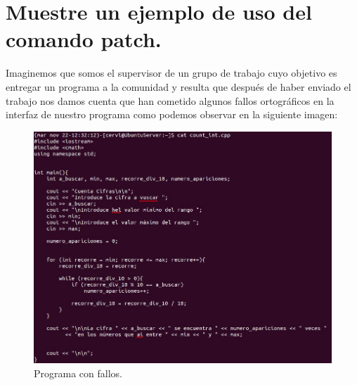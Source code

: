 \section{Muestre un ejemplo de uso del comando patch.}
Imaginemos que somos el supervisor de un grupo de trabajo cuyo objetivo es entregar un programa a la comunidad y resulta que después de haber enviado el trabajo nos damos cuenta que han cometido algunos fallos ortográficos en la interfaz de nuestro programa como podemos observar en la siguiente imagen:
\begin{figure}[H]
	\centering
	\includegraphics[scale=0.75]{cifras-mal.jpg}
	\caption{Programa con fallos. \label{fig:figura19}}
\end{figure}

